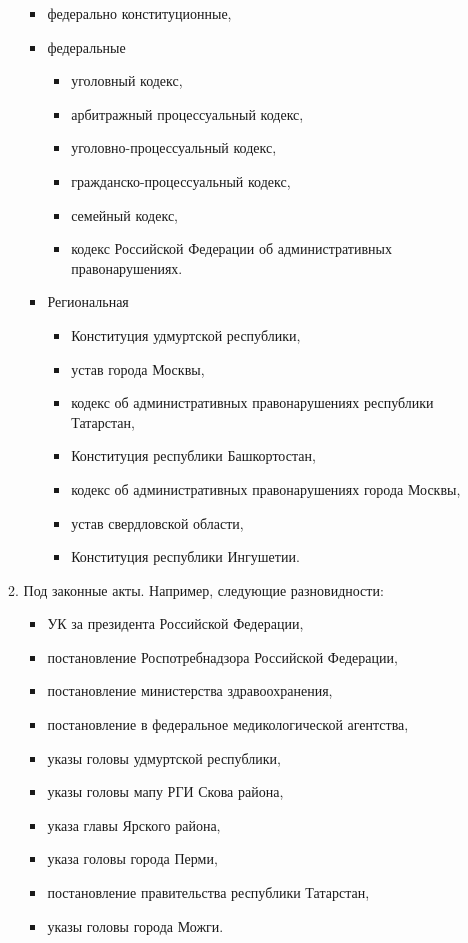 \begin{itemize}
\begin{enumerate}
        \begin{itemize}
          \item федерально конституционные,
          \item федеральные
            \begin{itemize}
              \item уголовный кодекс,
              \item арбитражный процессуальный кодекс,
              \item уголовно-процессуальный кодекс,
              \item гражданско-процессуальный кодекс,
              \item семейный кодекс,
              \item кодекс Российской Федерации об административных
                правонарушениях.
            \end{itemize}
          \item Региональная
            \begin{itemize}
              \item Конституция удмуртской республики,
              \item устав города Москвы,
              \item кодекс об административных правонарушениях
                республики Татарстан,
              \item Конституция республики Башкортостан,
              \item кодекс об административных правонарушениях города Москвы,
              \item устав свердловской области,
              \item Конституция республики Ингушетии.
            \end{itemize}
        \end{itemize}
      \item Под законные акты. Например, следующие разновидности:
        \begin{itemize}
          \item УК за президента Российской Федерации,
          \item постановление Роспотребнадзора Российской Федерации,
          \item постановление министерства здравоохранения,
          \item постановление в федеральное медикологической агентства,
          \item указы головы удмуртской республики,
          \item указы головы мапу РГИ Скова района,
          \item указа главы Ярского района,
          \item указа головы города Перми,
          \item постановление правительства республики Татарстан,
          \item указы головы города Можги.
        \end{itemize}
    \end{enumerate}
\end{itemize}
